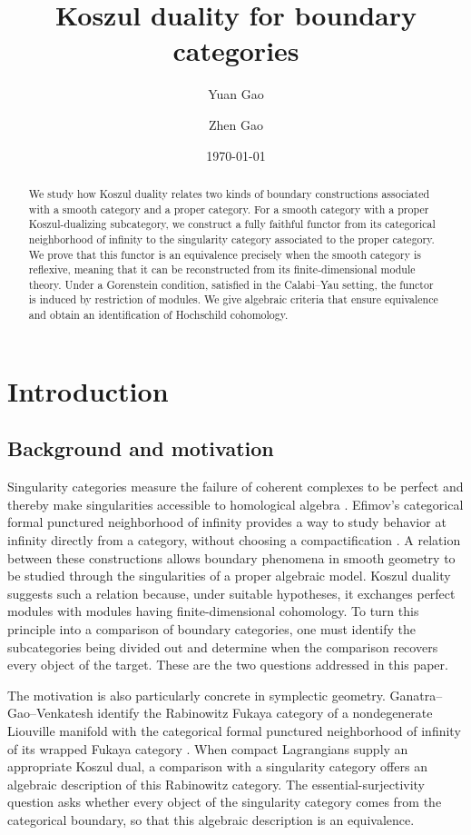 \documentclass[11pt,letterpaper,reqno]{amsart}
\title{Koszul duality for boundary categories}
\author{Yuan Gao}
\author{Zhen Gao}
\date{\today}
\theoremstyle{plain}
\theoremstyle{definition}
\theoremstyle{plain}
\theoremstyle{definition}
\numberwithin{equation}{section}
\begin{document}
\begin{abstract}
We study how Koszul duality relates two kinds of boundary constructions associated with a smooth category and a proper category.
For a smooth category with a proper Koszul-dualizing subcategory, we construct a fully faithful functor from its categorical neighborhood of infinity to the singularity category associated to the proper category.
We prove that this functor is an equivalence precisely when the smooth category is reflexive, meaning that it can be reconstructed from its finite-dimensional module theory.
Under a Gorenstein condition, satisfied in the Calabi--Yau setting, the functor is induced by restriction of modules.
We give algebraic criteria that ensure equivalence and obtain an identification of Hochschild cohomology.
\end{abstract}
\maketitle
\tableofcontents

\section{Introduction}\label{sec:introduction}

\subsection{Background and motivation}

Singularity categories measure the failure of coherent complexes to be perfect and thereby make singularities accessible to homological algebra \cite{Orlov2004}.
Efimov's categorical formal punctured neighborhood of infinity provides a way to study behavior at infinity directly from a category, without choosing a compactification \cite{Efimov2017}.
A relation between these constructions allows boundary phenomena in smooth geometry to be studied through the singularities of a proper algebraic model.
Koszul duality suggests such a relation because, under suitable hypotheses, it exchanges perfect modules with modules having finite-dimensional cohomology.
To turn this principle into a comparison of boundary categories, one must identify the subcategories being divided out and determine when the comparison recovers every object of the target.
These are the two questions addressed in this paper.

The motivation is also particularly concrete in symplectic geometry.
Ganatra--Gao--Venkatesh identify the Rabinowitz Fukaya category of a nondegenerate Liouville manifold with the categorical formal punctured neighborhood of infinity of its wrapped Fukaya category \cite[Theorem 1.1]{Ganatra-Gao-Venkatesh2022}.
When compact Lagrangians supply an appropriate Koszul dual, a comparison with a singularity category offers an algebraic description of this Rabinowitz category.
The essential-surjectivity question asks whether every object of the singularity category comes from the categorical boundary, so that this algebraic description is an equivalence.
\end{document}
